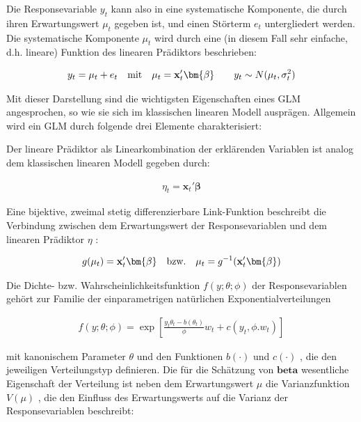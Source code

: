 Die Responsevariable $y_t$  kann also in eine systematische Komponente, die durch ihren Erwartungswert $\mu_t$  gegeben ist, und einen Störterm $e_t$ untergliedert werden. Die systematische Komponente $\mu_t$ wird durch eine (in diesem Fall sehr einfache, d.h. lineare) Funktion des linearen Prädiktors beschrieben:

\begin{eqnarray}
y_t = \mu_t + e_t    \quad \textnormal{mit} \quad   \mu_t = \mathbf{x}_t' \bm{\beta}  \qquad y_t \sim N(\mu_t,\sigma_t^2)
\end{eqnarray}

Mit dieser Darstellung sind die wichtigsten Eigenschaften eines GLM angesprochen, so wie sie sich im klassischen linearen Modell ausprägen. Allgemein wird ein GLM durch folgende drei Elemente charakterisiert:

Der lineare Prädiktor   als Linearkombination der erklärenden Variablen ist analog dem klassischen linearen Modell gegeben durch:

\begin{eqnarray} \label{eq:2}
\eta_t = \mathbf{x}_t' \bm{\beta}
\end{eqnarray}

Eine bijektive, zweimal stetig differenzierbare Link-Funktion   beschreibt die Verbindung zwischen dem Erwartungswert   der Responsevariablen und dem linearen Prädiktor  $\eta$ :
 	
\begin{eqnarray}  \label{eq:3}
g(\mu_t) = \mathbf{x}_t' \bm{\beta}  \quad \textnormal{bzw.} \quad  \mu_t = g^{-1}(\mathbf{x}_t' \bm{\beta})
\end{eqnarray}


Die Dichte- bzw. Wahrscheinlichkeitsfunktion $f(y;\theta;\phi)$ der Responsevariablen gehört zur Familie der einparametrigen natürlichen Exponentialverteilungen

\begin{eqnarray}
f(y;\theta;\phi) = \exp \left[ \frac{y_t \theta_t - b(\theta_t)}{\phi} w_t + c(y_t,\phi.w_t) \right]
\end{eqnarray}

mit kanonischem Parameter $\theta$  und den Funktionen $b(\cdot)$   und $c(\cdot)$ , die den jeweiligen Verteilungstyp definieren. Die für die Schätzung von $\bm{beta}$ wesentliche Eigenschaft der Verteilung ist neben dem Erwartungswert $\mu$  die Varianzfunktion $V(\mu)$ , die den Einfluss des Erwartungswerts auf die Varianz der Responsevariablen beschreibt:

